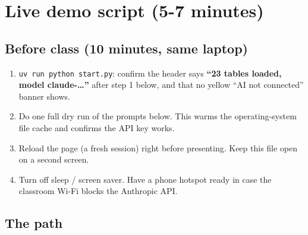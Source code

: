 \documentclass[
]{article}
\author{}
\date{\vspace{-2.5em}}
\providecommand{\tightlist}{%
  \setlength{\itemsep}{0pt}\setlength{\parskip}{0pt}}
\begin{document}
\section{Live demo script (5-7
minutes)}\label{live-demo-script-5-7-minutes}

\subsection{Before class (10 minutes, same
laptop)}\label{before-class-10-minutes-same-laptop}

\begin{enumerate}
\def\labelenumi{\arabic{enumi}.}
\tightlist
\item
  \texttt{uv\ run\ python\ start.py}: confirm the header says
  \textbf{``23 tables loaded, model claude-\ldots{}''} after step 1
  below, and that no yellow ``AI not connected'' banner shows.
\item
  Do one full dry run of the prompts below. This warms the
  operating-system file cache and confirms the API key works.
\item
  Reload the page (a fresh session) right before presenting. Keep this
  file open on a second screen.
\item
  Turn off sleep / screen saver. Have a phone hotspot ready in case the
  classroom Wi-Fi blocks the Anthropic API.
\end{enumerate}

\subsection{The path}\label{the-path}
\end{document}
